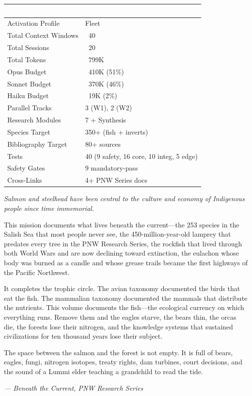 \documentclass[11pt,letterpaper]{article}
\newcommand{\tableheader}[1]{\textbf{\sffamily\textcolor{white}{#1}}}
\begin{document}
\begin{center}
\begin{tabularx}{\textwidth}{L{5cm}X}
\toprule
{}
\tableheader{Metric} & \tableheader{Value} \\
\midrule
Activation Profile & Fleet \\
Total Context Windows & ~40 \\
Total Sessions & ~20 \\
Total Tokens & ~799K \\
Opus Budget & ~410K (51\%) \\
Sonnet Budget & ~370K (46\%) \\
Haiku Budget & ~19K (2\%) \\
Parallel Tracks & 3 (W1), 2 (W2) \\
Research Modules & 7 + Synthesis \\
Species Target & 350+ (fish + inverts) \\
Bibliography Target & 80+ sources \\
Tests & 40 (9 safety, 16 core, 10 integ, 5 edge) \\
Safety Gates & 9 mandatory-pass \\
Cross-Links & 4+ PNW Series docs \\
\bottomrule
\end{tabularx}
\end{center}

\begin{quotebox}
\textit{Salmon and steelhead have been central to the culture and economy of Indigenous people since time immemorial.}

\vspace{0.5em}

This mission documents what lives beneath the current---the 253 species in the Salish Sea that most people never see, the 450-million-year-old lamprey that predates every tree in the PNW Research Series, the rockfish that lived through both World Wars and are now declining toward extinction, the eulachon whose body was burned as a candle and whose grease trails became the first highways of the Pacific Northwest.

It completes the trophic circle. The avian taxonomy documented the birds that eat the fish. The mammalian taxonomy documented the mammals that distribute the nutrients. This volume documents the fish---the ecological currency on which everything runs. Remove them and the eagles starve, the bears thin, the orcas die, the forests lose their nitrogen, and the knowledge systems that sustained civilizations for ten thousand years lose their subject.

The space between the salmon and the forest is not empty. It is full of bears, eagles, fungi, nitrogen isotopes, treaty rights, dam turbines, court decisions, and the sound of a Lummi elder teaching a grandchild to read the tide.

\vspace{0.5em}
\hfill\textit{--- Beneath the Current, PNW Research Series}
\end{quotebox}
\end{document}
